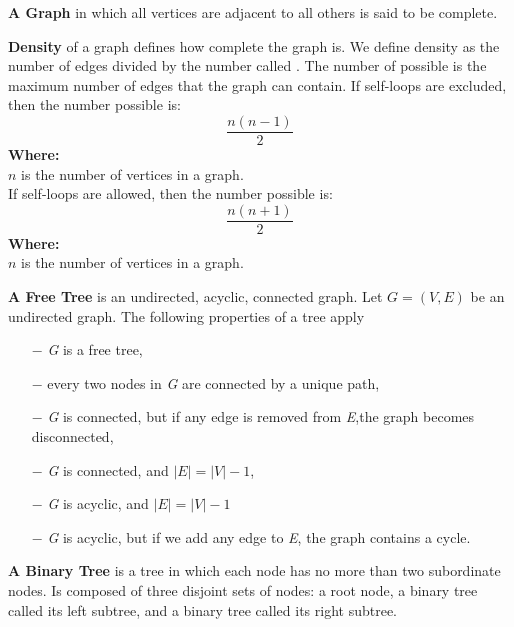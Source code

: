 	\newpage
	\begin{definition} \textbf{A Graph} in which all vertices are adjacent to all others is said to be complete. \end{definition}
	\begin{definition} \textbf{Density} of a graph defines how complete the graph is. We define density as the number of edges divided by the number called . The number of possible is the maximum number of edges that the graph can contain.
	If self-loops are excluded, then the number possible is:\\
	\begin{equation}\label{acyclic_density}
	\frac{n(n-1)}{2}
	\end{equation}
	\textbf{Where:}\\
	$n$ is the number of vertices in a graph.\\
	\newline
	If self-loops are allowed, then the number possible is:
	\begin{equation}\label{cyclic_density}
	\frac{n(n+1)}{2}
	\end{equation}
	\textbf{Where:}\\
	$n$ is the number of vertices in a graph.
	\newline
	\end{definition}
\begin{definition}\textbf{A Free Tree} is an undirected, acyclic, connected graph. Let $G = (V,E)$ be an undirected graph. The following properties of a tree apply \\
\begin{itemize}
	\item[$-$] \textit{G} is a free tree,
	\item[$-$] every two nodes in \textit{G} are connected by a unique path,
	\item[$-$] \textit{G} is connected, but if any edge is removed from \textit{E},the graph becomes disconnected,
	\item[$-$] \textit{G} is connected, and $|E| = |V| - 1$,
	\item[$-$] \textit{G} is acyclic, and $|E| = |V| - 1$
	\item[$-$] \textit{G} is acyclic, but if we add any edge to \textit{E}, the graph contains a cycle. 
	\end{itemize}
\end{definition}
\begin{definition}\textbf{A Binary Tree} is a tree in which each node has no more than two subordinate nodes. Is composed of three disjoint sets of nodes: a root node, a binary tree called its left subtree, and a binary tree called its right subtree.\end{definition}
